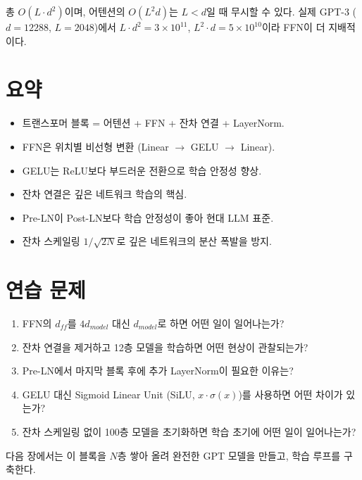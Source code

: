 총 $O(L \cdot d^2)$이며, 어텐션의 $O(L^2 d)$는 $L < d$일 때 무시할 수 있다. 실제 GPT-3 ($d = 12288$, $L = 2048$)에서 $L \cdot d^2 = 3 \times 10^{11}$, $L^2 \cdot d = 5 \times 10^{10}$이라 FFN이 더 지배적이다.

\section{요약}

\begin{itemize}
  \item 트랜스포머 블록 = 어텐션 + FFN + 잔차 연결 + LayerNorm.
  \item FFN은 위치별 비선형 변환 (Linear $\to$ GELU $\to$ Linear).
  \item GELU는 ReLU보다 부드러운 전환으로 학습 안정성 향상.
  \item 잔차 연결은 깊은 네트워크 학습의 핵심.
  \item Pre-LN이 Post-LN보다 학습 안정성이 좋아 현대 LLM 표준.
  \item 잔차 스케일링 $1/\sqrt{2N}$로 깊은 네트워크의 분산 폭발을 방지.
\end{itemize}

\section{연습 문제}

\begin{enumerate}
  \item FFN의 $d_{ff}$를 $4d_{model}$ 대신 $d_{model}$로 하면 어떤 일이 일어나는가?
  \item 잔차 연결을 제거하고 12층 모델을 학습하면 어떤 현상이 관찰되는가?
  \item Pre-LN에서 마지막 블록 후에 추가 LayerNorm이 필요한 이유는?
  \item GELU 대신 Sigmoid Linear Unit (SiLU, $x \cdot \sigma(x)$)를 사용하면 어떤 차이가 있는가?
  \item 잔차 스케일링 없이 100층 모델을 초기화하면 학습 초기에 어떤 일이 일어나는가?
\end{enumerate}

다음 장에서는 이 블록을 $N$층 쌓아 올려 완전한 GPT 모델을 만들고, 학습 루프를 구축한다.
